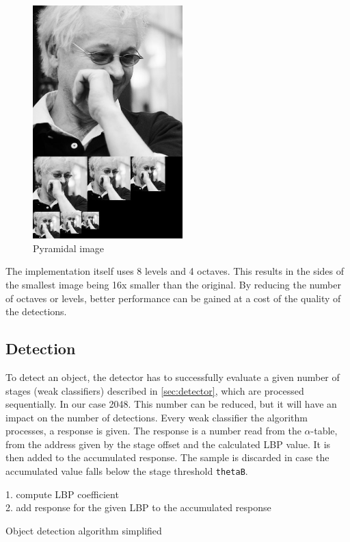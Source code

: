 \begin{center}
\begin{figure}[h]
	\centering\includegraphics[height=9cm]{fig/pyramid.jpg}
	\caption{Pyramidal image}
\end{figure}
\end{center}

The implementation itself uses 8 levels and 4 octaves. This results in the sides of the smallest image being 16x smaller than the original. By reducing the number of octaves or levels, better performance can be gained at a cost of the quality of the detections.

\subsection{Detection}

To detect an object, the detector has to successfully evaluate a given number of stages (weak classifiers) described in \ref{sec:detector}, which are processed sequentially. In our case 2048. This number can be reduced, but it will have an impact on the number of detections. Every weak classifier the algorithm processes, a response is given. The response is a number read from the $\alpha$-table, from the address given by the stage offset and the calculated LBP value. It is then added to the accumulated response. The sample is discarded in case the accumulated value falls below the stage threshold \verb|thetaB|.

\begin{algorithm} \label{alg:detection}
{
	{
		1. compute LBP coefficient \\
		2. add response for the given LBP to the accumulated response \\
	}
}

\caption{Object detection algorithm simplified}
\end{algorithm}

